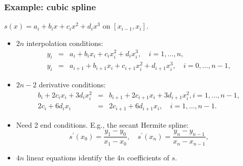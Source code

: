 \documentclass[bigger]{beamer}
\begin{document}
\begin{frame}%

\frametitle{Example: cubic spline}

$s(x)=a_{i}+b_{i}x+c_{i}x^{2}+d_{i}x^{3}$ on $[x_{i-1},x_{i}]$.

\begin{itemize}
\item $2n$ interpolation conditions: 
\begin{eqnarray*}
y_{i} &=&a_{i}+b_{i}x_{i}+c_{i}x_{i}^{2}+d_{i}x_{i}^{3},\quad i=1,\ldots ,n,
\\
y_{i} &=&a_{i+1}+b_{i+1}x_{i}+c_{i+1}x_{i}^{2}+d_{i+1}x_{i}^{3},\quad
i=0,\ldots ,n-1,
\end{eqnarray*}

\item $2n-2$ derivative conditions:%
\begin{eqnarray*}
b_{i}+2c_{i}x_{i}+3d_{i}x_{i}^{2}
&=&b_{i+1}+2c_{i+1}x_{i}+3d_{i+1}x_{i}^{2}, i=1,\ldots,n-1, \\
2c_{i}+6d_{i}x_{i} &=&2c_{i+1}+6d_{i+1}x_{i},\quad i=1,\ldots ,n-1.
\end{eqnarray*}

\item Need 2 end conditions. E.g., the secant Hermite spline:%
\begin{equation*}
s^{\prime }(x_{0})=\frac{y_{1}-y_{0}}{x_{1}-x_{0}},\quad s^{\prime }(x_{n})=%
\frac{y_{n}-y_{n-1}}{x_{n}-x_{n-1}},
\end{equation*}

\item $4n$ linear equations identify the $4n$ coefficients of $s$.
\end{itemize}


\end{frame}%
\end{document}
